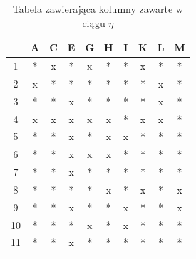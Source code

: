 \documentclass[12pt,twoside]{article}
\begin{document}
\begin{enumerate}[label=\arabic*), leftmargin=1.25cm]
          \begin{table}[ht]
              \caption{Tabela zawierająca kolumny zawarte w ciągu $\eta$}
              \centering
              \begin{tabular}{|c|c|c|c|c|c|c|c|c|c|}
                  \hline
                     & A & C & E & G & H & I & K & L & M \\ \hline
                  1  & * & x & * & x & * & * & x & * & * \\ \hline
                  2  & x & * & * & * & * & * & * & x & * \\ \hline
                  3  & * & * & x & * & * & * & * & x & * \\ \hline
                  4  & x & x & x & x & x & * & x & x & * \\ \hline
                  5  & * & * & x & * & x & x & * & * & * \\ \hline
                  6  & * & * & x & x & x & * & * & * & * \\ \hline
                  7  & * & * & x & * & * & * & * & * & * \\ \hline
                  8  & * & * & * & * & x & * & x & * & x \\ \hline
                  9  & * & * & x & * & * & x & * & * & x \\ \hline
                  10 & * & * & * & x & * & x & * & * & * \\ \hline
                  11 & * & * & x & * & * & * & * & * & * \\ \hline
              \end{tabular}
              \label{tab:3_nan}
          \end{table}
          \FloatBarrier


\end{enumerate}
\end{document}
